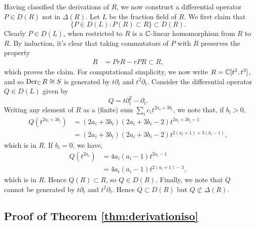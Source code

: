 \begin{example}
    Having classified the derivations of $R$, we now construct a differential operator
    $P\in D(R)$ not in $\Delta(R)$. Let $L$ be the fraction field of $R$. We first claim that
    \[\{P\in D(L):P(R)\subset R\}\subset D(R).\]
    Clearly $P\in D(L)$, when restricted to $R$ is a $\mathbb{C}$-linear homomorphism from $R$ to $R$.
    By induction, it's clear that taking commutators of $P$ with $R$ preserves the property 
    \begin{align*}
        [P,r]R &= PrR-rPR\subset R,
    \end{align*}
    which proves the claim. For computational simplicity, we now write $R=\mathbb{C}[t^2,t^3]$, and so
    $\operatorname{Der}_{\mathbb{C}} R\cong S$ is generated by $t\partial_t$ and $t^2\partial_t$. Consider the differential operator $Q\in D(L)$ given by
    \[Q = t\partial_t^2-\partial_t.\]
    Writing any element of $R$ as a (finite) sum $\sum_i c_it^{2a_i+3b_i}$, we note that,
    if $b_i>0$,
    \begin{align*}
        Q(t^{2a_i+3b_i}) &= (2a_i+3b_i)(2a_i+3b_i-2)t^{2a_i+3b_i-1}\\
        &= (2a_i+3b_i)(2a_i+3b_i-2)t^{2(a_i+1)+3(b_i-1)},
    \end{align*}
    which is in $R$. If $b_i=0$, we have,
    \begin{align*}
        Q(t^{2a_i}) &= 4a_i(a_i-1)t^{2a_i-1}\\
        &= 4a_i(a_i-1)t^{2(a_i+1)-3},
    \end{align*}
    which is in $R$. Hence $Q(R)\subset R$, so $Q\in D(R)$. Finally, we note that $Q$
    cannot be generated by $t\partial_t$ and $t^2\partial_t$.
    Hence $Q\subset D(R)$ but $Q\not\subset\Delta(R)$.
\end{example}

\subsection{Proof of Theorem \ref{thm:derivationiso}}

